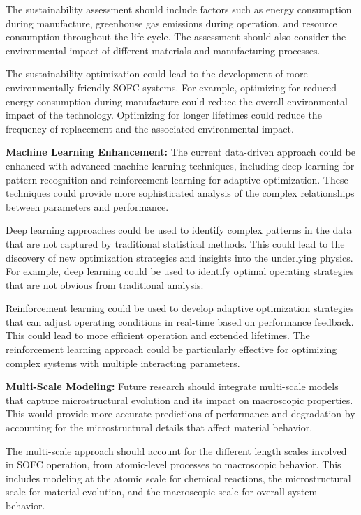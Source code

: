 \documentclass[conference]{IEEEtran}
\begin{document}
The sustainability assessment should include factors such as energy consumption during manufacture, greenhouse gas emissions during operation, and resource consumption throughout the life cycle. The assessment should also consider the environmental impact of different materials and manufacturing processes.

The sustainability optimization could lead to the development of more environmentally friendly SOFC systems. For example, optimizing for reduced energy consumption during manufacture could reduce the overall environmental impact of the technology. Optimizing for longer lifetimes could reduce the frequency of replacement and the associated environmental impact.

\textbf{Machine Learning Enhancement:} The current data-driven approach could be enhanced with advanced machine learning techniques, including deep learning for pattern recognition and reinforcement learning for adaptive optimization. These techniques could provide more sophisticated analysis of the complex relationships between parameters and performance.

Deep learning approaches could be used to identify complex patterns in the data that are not captured by traditional statistical methods. This could lead to the discovery of new optimization strategies and insights into the underlying physics. For example, deep learning could be used to identify optimal operating strategies that are not obvious from traditional analysis.

Reinforcement learning could be used to develop adaptive optimization strategies that can adjust operating conditions in real-time based on performance feedback. This could lead to more efficient operation and extended lifetimes. The reinforcement learning approach could be particularly effective for optimizing complex systems with multiple interacting parameters.

\textbf{Multi-Scale Modeling:} Future research should integrate multi-scale models that capture microstructural evolution and its impact on macroscopic properties. This would provide more accurate predictions of performance and degradation by accounting for the microstructural details that affect material behavior.

The multi-scale approach should account for the different length scales involved in SOFC operation, from atomic-level processes to macroscopic behavior. This includes modeling at the atomic scale for chemical reactions, the microstructural scale for material evolution, and the macroscopic scale for overall system behavior.
\end{document}
